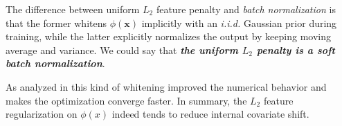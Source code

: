 The difference between uniform $L_2$ feature penalty and \textit{batch normalization} is that the former whitens $\phi(\mathbf{x})$ implicitly with an \textit{i.i.d.} Gaussian prior during training, while the latter explicitly normalizes the output by keeping moving average and variance. We could say that \textbf{\textit{the uniform $L_2$ penalty is a soft batch normalization}}. 

As analyzed in \cite{analysis-loglinear}
this kind of whitening improved the numerical behavior and makes the optimization converge faster. In summary, the $L_2$ feature regularization on $\phi(x)$ indeed tends to reduce internal covariate shift.